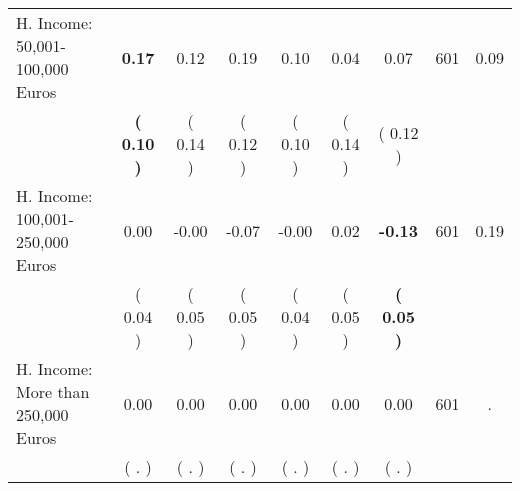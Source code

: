 \begin{tabular}{lcccccccc}
H. Income: 50,001-100,000 Euros & \textbf{     0.17} &      0.12 &      0.19 &      0.10 &      0.04 &      0.07 & 601 &       0.09 \\ 
 & \textbf{(     0.10 )} & (     0.14 ) & (     0.12 ) & (     0.10 ) & (     0.14 ) & (     0.12 ) & \\
H. Income: 100,001-250,000 Euros &      0.00 &     -0.00 &     -0.07 &     -0.00 &      0.02 & \textbf{    -0.13} & 601 &       0.19 \\ 
 & (     0.04 ) & (     0.05 ) & (     0.05 ) & (     0.04 ) & (     0.05 ) & \textbf{(     0.05 )} & \\
H. Income: More than 250,000 Euros &      0.00 &      0.00 &      0.00 &      0.00 &      0.00 &      0.00 & 601 &          . \\ 
 & (        . ) & (        . ) & (        . ) & (        . ) & (        . ) & (        . ) & \\
\bottomrule
\end{tabular}

